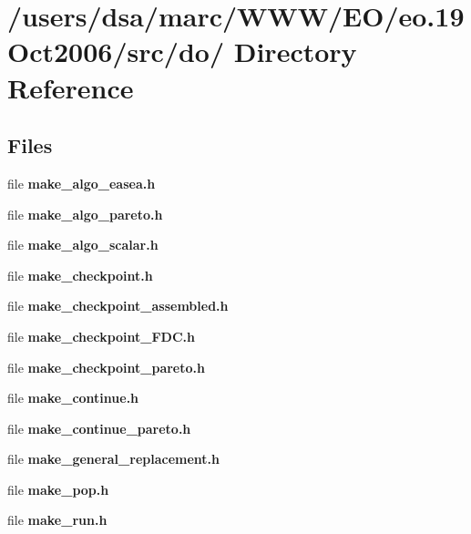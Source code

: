 \section{/users/dsa/marc/WWW/EO/eo.19Oct2006/src/do/ Directory Reference}
\label{dir_000025}
\subsection*{Files}
\begin{CompactItemize}
\item 
file {\bf make_algo_easea.h}
\item 
file {\bf make_algo_pareto.h}
\item 
file {\bf make_algo_scalar.h}
\item 
file {\bf make_checkpoint.h}
\item 
file {\bf make_checkpoint_assembled.h}
\item 
file {\bf make_checkpoint_FDC.h}
\item 
file {\bf make_checkpoint_pareto.h}
\item 
file {\bf make_continue.h}
\item 
file {\bf make_continue_pareto.h}
\item 
file {\bf make_general_replacement.h}
\item 
file {\bf make_pop.h}
\item 
file {\bf make_run.h}
\end{CompactItemize}
